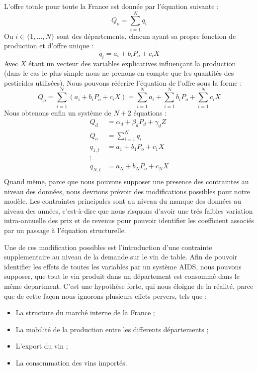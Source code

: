 \documentclass[11pt, a4paper]{article}
\begin{document}
\par
L'offre totale pour toute la France est donnée par l'équation suivante : 
\begin{equation}
    Q_o = \sum_{i = 1}^{N} q_i
\end{equation}
Ou $i \in \{1, ..., N\}$ sont des départements, chacun ayant sa propre fonction de production et d'offre unique : 
\begin{equation}
    q_i = a_i + b_i P_o + c_i X
\end{equation}
Avec $X$ étant un vecteur des variables explicatives influençant la production (dans le cas le plus simple nous ne prenons en compte que les quantités des pesticides utilisées).
Nous pouvons réécrire l'équation de l'offre sous la forme :
\begin{equation}
    Q_o = \sum_{i = 1}^{N} (a_i + b_i P_o + c_i X) = \sum_{i = 1}^{N} a_i + \sum_{i = 1}^{N} b_i P_o + \sum_{i = 1}^{N} c_i X
\end{equation}
Nous obtenons enfin un système de $N + 2$ équations : 
\begin{align*}
    Q_d & = \alpha_d + \beta_d P_d + \gamma_d Z \\
    Q_o & = \sum_{i = 1}^{N} q_i \\
    q_{1,t} & = a_1 + b_1 P_o + c_1 X \\ 
    \vdots \\ 
    q_{N,t} & = a_N + b_N P_o + c_N X \\
\end{align*}
Quand même, parce que nous pouvons supposer une presence des contraintes au niveau des données, nous devrions prévoir des modifications possibles pour notre modèle.
Les contraintes principales sont au niveau du manque des données au niveau des années, c'est-à-dire que nous risquons d'avoir une trés faibles variation intra-annuelle des prix et de revenus pour pouvoir identifier les coefficient associés par un passage à l'équation structurelle.
\par
Une de ces modification possibles est l'introduction d'une contrainte supplementaire au niveau de la demande sur le vin de table.
Afin de pouvoir identifier les effets de toutes les variables par un système AIDS, nous pouvons supposer, que tout le vin produit dans un département est consommé dans le même department.
C'est une hypothèse forte, qui nous éloigne de la réalité, parce que de cette façon nous ignorons plusieurs effets pervers, tels que :
\begin{itemize}
  \item La structure du marché interne de la France ;
  \item La mobilité de la production entre les differents départements ;
  \item L'export du vin ;
  \item La consommation des vins importés.
\end{itemize}
\end{document}
